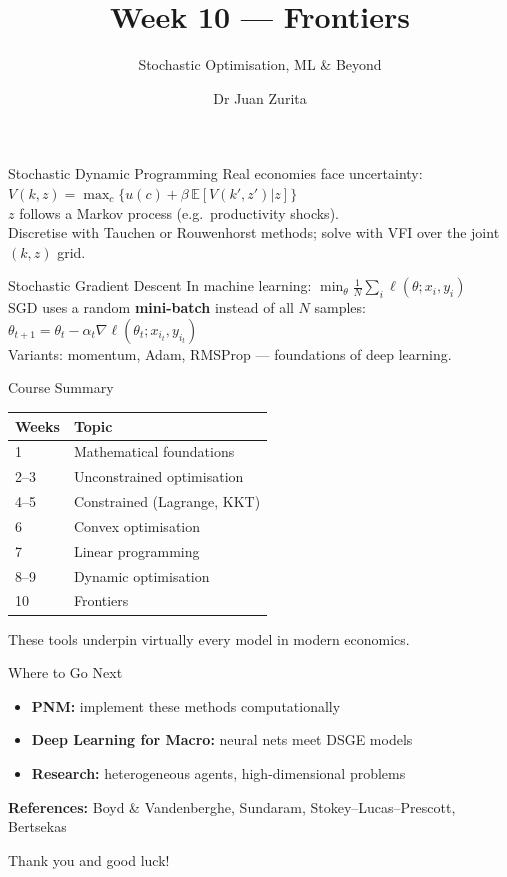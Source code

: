 \documentclass[aspectratio=169, 10pt]{beamer}
\title{Week 10 --- Frontiers}
\subtitle{Stochastic Optimisation, ML \& Beyond}
\author{Dr Juan Zurita}
\institute{Optimisation \& Mathematical Methods for Economics\\
The University of Edinburgh~$\cdot$~School of Economics}
\date{}
\begin{document}
\maketitle

\begin{frame}{Stochastic Dynamic Programming}
Real economies face uncertainty: $V(k,z) = \max_c\{u(c) + \beta\,\mathbb{E}[V(k',z')|z]\}$\\\bigskip $z$ follows a Markov process (e.g.\ productivity shocks).\\\bigskip Discretise with Tauchen or Rouwenhorst methods; solve with VFI over the joint $(k,z)$ grid.
\end{frame}

\begin{frame}{Stochastic Gradient Descent}
In machine learning: $\min_\theta\frac{1}{N}\sum_i\ell(\theta;x_i,y_i)$\\\bigskip SGD uses a random \textbf{mini-batch} instead of all $N$ samples:\\ $\theta_{t+1} = \theta_t - \alpha_t\nabla\ell(\theta_t; x_{i_t}, y_{i_t})$\\\bigskip Variants: momentum, Adam, RMSProp --- foundations of deep learning.
\end{frame}

\begin{frame}{Course Summary}
\begin{center}\begin{tabular}{ll}\toprule Weeks & Topic \\ \midrule 1 & Mathematical foundations \\ 2--3 & Unconstrained optimisation \\ 4--5 & Constrained (Lagrange, KKT) \\ 6 & Convex optimisation \\ 7 & Linear programming \\ 8--9 & Dynamic optimisation \\ 10 & Frontiers \\ \bottomrule\end{tabular}\end{center}\par\bigskip These tools underpin virtually every model in modern economics.
\end{frame}

\begin{frame}{Where to Go Next}
\begin{itemize}\item \textbf{PNM:} implement these methods computationally\item \textbf{Deep Learning for Macro:} neural nets meet DSGE models\item \textbf{Research:} heterogeneous agents, high-dimensional problems\end{itemize}\par\bigskip\textbf{References:} Boyd \& Vandenberghe, Sundaram, Stokey--Lucas--Prescott, Bertsekas\par\bigskip\alert{Thank you and good luck!}
\end{frame}
\end{document}
